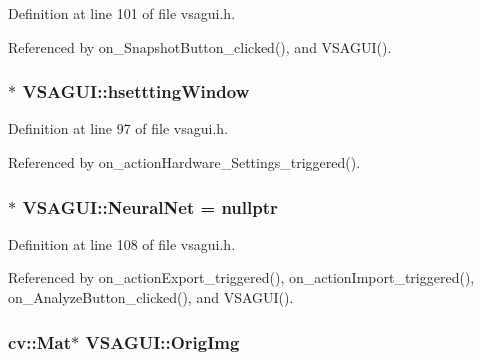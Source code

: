Definition at line 101 of file vsagui.\+h.



Referenced by on\+\_\+\+Snapshot\+Button\+\_\+clicked(), and V\+S\+A\+G\+U\+I().

\hypertarget{class_v_s_a_g_u_i_ad7a55217e7216e0badaa15e12a7654ff}{}
\subsubsection[{hsettting\+Window}]{$\ast$ V\+S\+A\+G\+U\+I\+::hsettting\+Window\hspace{0.3cm}{\ttfamily [private]}}\label{class_v_s_a_g_u_i_ad7a55217e7216e0badaa15e12a7654ff}


Definition at line 97 of file vsagui.\+h.



Referenced by on\+\_\+action\+Hardware\+\_\+\+Settings\+\_\+triggered().

\hypertarget{class_v_s_a_g_u_i_aaf0cb2947a03baddcb811eaa07c299e3}{}
\subsubsection[{Neural\+Net}]{$\ast$ V\+S\+A\+G\+U\+I\+::\+Neural\+Net = nullptr\hspace{0.3cm}{\ttfamily [private]}}\label{class_v_s_a_g_u_i_aaf0cb2947a03baddcb811eaa07c299e3}


Definition at line 108 of file vsagui.\+h.



Referenced by on\+\_\+action\+Export\+\_\+triggered(), on\+\_\+action\+Import\+\_\+triggered(), on\+\_\+\+Analyze\+Button\+\_\+clicked(), and V\+S\+A\+G\+U\+I().

\hypertarget{class_v_s_a_g_u_i_ae74be8a44b34a65cb189d9b58ee40455}{}
\subsubsection[{Orig\+Img}]{\setlength{\rightskip}{0pt plus 5cm}cv\+::\+Mat$\ast$ V\+S\+A\+G\+U\+I\+::\+Orig\+Img\hspace{0.3cm}{\ttfamily [private]}}\label{class_v_s_a_g_u_i_ae74be8a44b34a65cb189d9b58ee40455}


